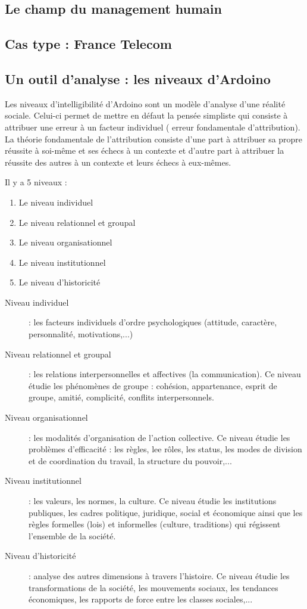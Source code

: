 \documentclass[12pt]{article}
\begin{document}
  \subsection{Le champ du management humain}
  \subsection{Cas type : France Telecom}
  \subsection{Un outil d'analyse : les niveaux d'Ardoino}
  Les niveaux d'intelligibilité d'Ardoino sont un modèle d'analyse d'une réalité sociale. Celui-ci permet de mettre en défaut la pensée simpliste qui consiste à attribuer une erreur à un facteur individuel (\og{} erreur fondamentale d'attribution\fg{}). La théorie fondamentale de l'attribution consiste d'une part à attribuer sa propre réussite à soi-même et ses échecs à un contexte et d'autre part à attribuer la réussite des autres à un contexte et leurs échecs à eux-mêmes.
  
  Il y a 5 niveaux :
  
  \begin{enumerate}
   \item Le niveau individuel
   \item Le niveau relationnel et groupal
   \item Le niveau organisationnel
   \item Le niveau institutionnel
   \item Le niveau d'historicité
  \end{enumerate}
  
  
  \begin{description}
   \item[Niveau individuel] : les facteurs individuels d'ordre psychologiques (attitude, caractère, personnalité, motivations,...)
   \item[Niveau relationnel et groupal] : les relations interpersonnelles et affectives (la communication). Ce niveau étudie les phénomènes de groupe : cohésion, appartenance, esprit de groupe, amitié, complicité, conflits interpersonnels.
   \item[Niveau organisationnel] : les modalités d'organisation de l'action collective. Ce niveau étudie les problèmes d'efficacité : les règles, lee rôles, les status, les modes de division et de coordination du travail, la structure du pouvoir,... 
   \item[Niveau institutionnel] : les valeurs, les normes, la culture. Ce niveau étudie les institutions publiques, les cadres politique, juridique, social et économique ainsi que les règles formelles (lois) et informelles (culture, traditions) qui régissent l'ensemble de la société.
   \item[Niveau d'historicité] : analyse des autres dimensions à travers l'histoire. Ce niveau étudie les transformations de la société, les mouvements sociaux, les tendances économiques, les rapports de force entre les classes sociales,...
  \end{description}
\end{document}
